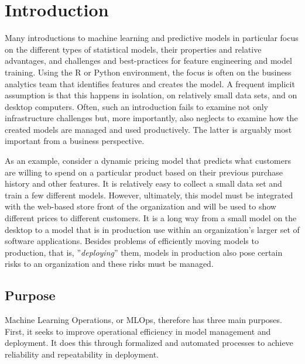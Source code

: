 \section{Introduction}

Many introductions to machine learning and predictive models in particular focus on the different types of statistical models, their properties and relative advantages, and challenges and best-practices for feature engineering and model training. Using the R or Python environment, the focus is often on the business analytics team that identifies features and creates the model. A frequent implicit assumption is that this happens in isolation, on relatively small data sets, and on desktop computers. Often, such an introduction fails to examine not only infrastructure challenges but, more importantly, also neglects to examine how the created models are managed and used productively. The latter is arguably most important from a business perspective.

As an example, consider a dynamic pricing model that predicts what customers are willing to spend on a particular product based on their previous purchase history and other features. It is relatively easy to collect a small data set and train a few different models. However, ultimately, this model must be integrated with the web-based store front of the organization and will be used to show different prices to different customers. It is a long way from a small model on the desktop to a model that is in production use within an organization's larger set of software applications. Besides problems of efficiently moving models to production, that is, ''\emph{deploying}'' them, models in production also pose certain risks to an organization and these risks must be managed. 

\subsection*{Purpose}

Machine Learning Operations, or MLOps, therefore has three main purposes. First, it seeks to improve operational efficiency in model management and deployment. It does this through formalized and automated processes to achieve reliability and repeatability in deployment. 

